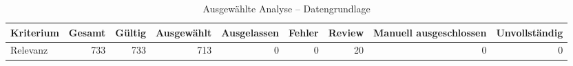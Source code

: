\begin{table}[htbp]
\centering
\caption{Ausgewählte Analyse -- Datengrundlage}
\begin{tabular}{lrrrrrrrr}
\toprule
Kriterium & Gesamt & Gültig & Ausgewählt & Ausgelassen & Fehler & Review & Manuell ausgeschlossen & Unvollständig \\
\midrule
Relevanz & 733 & 733 & 713 & 0 & 0 & 20 & 0 & 0 \\
\bottomrule
\end{tabular}
\end{table}
